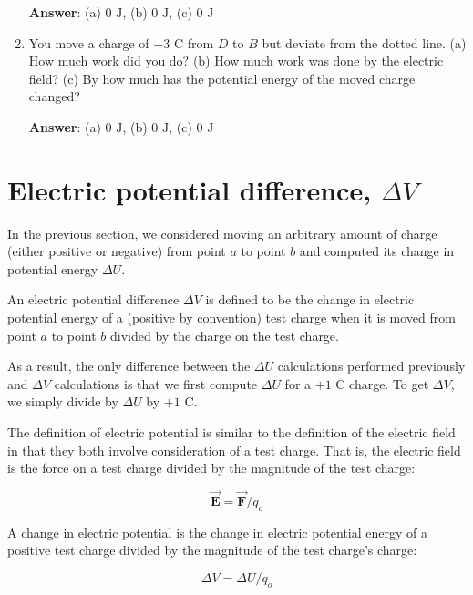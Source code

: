 \documentclass{article}
\newcommand{\bfvec}[1]{\vec{\mathbf{#1}}}
\begin{document}
\begin{enumerate}
        \ifsolutions
          \textbf{Answer}: (a) $0\text{ J}$, (b) $0\text{ J}$, (c) $0\text{ J}$
        \fi

  \item You move a charge of $-3\text{ C}$ from $D$ to $B$ but deviate from the dotted line. (a) How much work did you do? (b) How much work was done by the electric field? (c) By how much has the potential energy of the moved charge changed?

        \ifsolutions
          \textbf{Answer}: (a) $0\text{ J}$, (b) $0\text{ J}$, (c) $0\text{ J}$
        \fi

\end{enumerate}

\section{Electric potential difference, $\Delta V$}

In the previous section, we considered moving an arbitrary amount of charge (either positive or negative) from point $a$ to point $b$ and computed its change in potential energy $\Delta U$. 

An electric potential difference $\Delta V$ is defined to be the change in electric potential energy of a (positive by convention) test charge when it is moved from point $a$ to point $b$ divided by the charge on the test charge.

As a result, the only difference between the $\Delta U$ calculations performed previously and $\Delta V$ calculations is that we first compute $\Delta U$ for a $+1\text{ C}$ charge. To get $\Delta V$, we simply divide by $\Delta U$ by $+1\text{ C}$.

The definition of electric potential is similar to the definition of the electric field in that they both involve consideration of a test charge. That is, the electric field is the force on a test charge divided by the magnitude of the test charge:

\begin{equation}\bfvec{E} = {\bfvec{F}}/{q_o}\end{equation}

A change in electric potential is the change in electric potential energy of a positive test charge divided by the magnitude of the test charge's charge:

\begin{equation}\Delta V = {\Delta U}/{q_o}\end{equation}
\end{document}
